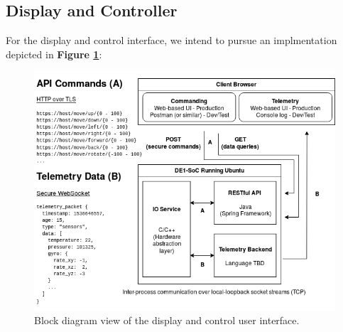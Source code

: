 \documentclass{article}
\begin{document}

\pagebreak

\subsection{Display and Controller}

For the display and control interface, we intend to pursue an
implmentation depicted in \textbf{Figure \ref{fig:display_controller}}:

\begin{figure}[H]
	\centering
	\includegraphics[width=\linewidth]{../src/im/display_controller}
	\caption{Block diagram view of the display and control user
		interface.}
	\label{fig:display_controller}
\end{figure}

\end{document}
